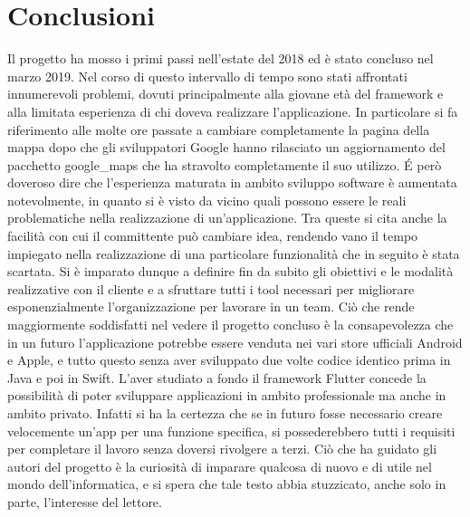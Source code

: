 \chapter{Conclusioni}
Il progetto ha mosso i primi passi nell'estate del 2018 ed è stato concluso nel
marzo 2019. Nel corso di questo intervallo di tempo sono stati affrontati
innumerevoli problemi, dovuti principalmente alla giovane età del framework e
alla limitata esperienza di chi doveva realizzare l'applicazione.
In particolare si fa riferimento alle molte ore passate a cambiare completamente la pagina della
mappa dopo che gli sviluppatori Google hanno rilasciato un aggiornamento del
pacchetto google\_maps che ha stravolto completamente il suo utilizzo. \'E però
doveroso dire che l'esperienza maturata in ambito sviluppo software è aumentata
notevolmente, in quanto si è visto da vicino quali possono essere le reali
problematiche nella realizzazione di un'applicazione. Tra queste si cita anche
la facilità con cui il committente può cambiare idea, rendendo vano il tempo
impiegato nella realizzazione di una particolare funzionalità che in seguito è
stata scartata. Si è imparato dunque a definire fin da subito gli obiettivi e le
modalità realizzative con il cliente e a sfruttare tutti i tool necessari per
migliorare esponenzialmente l'organizzazione per lavorare in un team. Ciò che
rende maggiormente soddisfatti nel vedere il progetto concluso è la
consapevolezza che in un futuro l'applicazione potrebbe essere venduta nei vari
store ufficiali Android e Apple, e tutto questo senza aver sviluppato due volte
codice identico prima in Java e poi in Swift. L'aver studiato a fondo il
framework Flutter concede la possibilità di poter sviluppare applicazioni in
ambito professionale ma anche in ambito privato. Infatti si ha la certezza che
se in futuro fosse necessario creare velocemente un'app per una funzione
specifica, si possederebbero tutti i requisiti per completare il lavoro senza
doversi rivolgere a terzi. Ciò che ha guidato gli autori del progetto è la
curiosità di imparare qualcosa di nuovo e di utile nel mondo dell'informatica, e
si spera che tale testo abbia stuzzicato, anche solo in parte, l'interesse del lettore.  